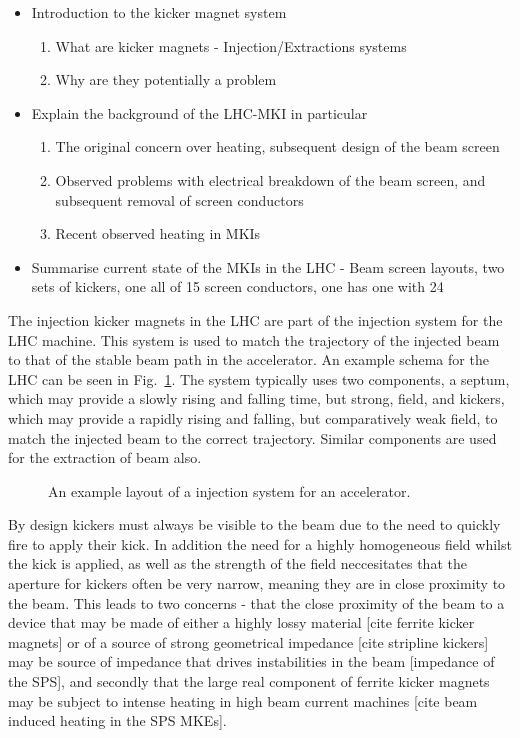 
\begin{itemize}
\item{Introduction to the kicker magnet system}
\begin{enumerate}
\item{What are kicker magnets - Injection/Extractions systems}
\item{Why are they potentially a problem}
\end{enumerate}
\item{Explain the background of the LHC-MKI in particular}
\begin{enumerate}
\item{The original concern over heating, subsequent design of the beam screen}
\item{Observed problems with electrical breakdown of the beam screen, and subsequent removal of screen conductors}
\item{Recent observed heating in MKIs}
\end{enumerate}
\item{Summarise current state of the MKIs in the LHC - Beam screen layouts, two sets of kickers, one all of 15 screen conductors, one has one with 24}
\end{itemize}

The injection kicker magnets in the LHC are part of the injection system for the LHC machine. This system is used to match the trajectory of the injected beam to that of the stable beam path in the accelerator. An example schema for the LHC can be seen in Fig.~\ref{fig:injection-system-schema}. The system typically uses two components, a septum, which may provide a slowly rising and falling time, but strong, field, and kickers, which may provide a rapidly rising and falling, but comparatively weak field, to match the injected beam to the correct trajectory. Similar components are used for the extraction of beam also.

\begin{figure}

\label{fig:injection-system-schema}
\caption{An example layout of a injection system for an accelerator.}
\end{figure}

By design kickers must always be visible to the beam due to the need to quickly fire to apply their kick. In addition the need for a highly homogeneous field whilst the kick is applied, as well as the strength of the field neccesitates that the aperture for kickers often be very narrow, meaning they are in close proximity to the beam. This leads to two concerns - that the close proximity of the beam to a device that may be made of either a highly lossy material [cite ferrite kicker magnets] or of a source of strong geometrical impedance [cite stripline kickers] may be source of impedance that drives instabilities in the beam [impedance of the SPS], and secondly that the large real component of ferrite kicker magnets may be subject to intense heating in high beam current machines [cite beam induced heating in the SPS MKEs]. 